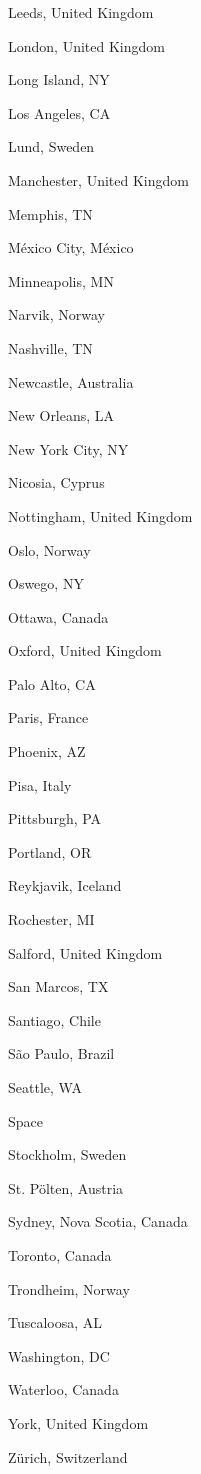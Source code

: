 \documentclass[20pt,landscape]{foils}
\begin{document}
\begin{list1}
\begin{list2}
    \item Leeds, United Kingdom
    \item London, United Kingdom
    \item Long Island, NY
    \item Los Angeles, CA
    \item Lund, Sweden
    \item Manchester, United Kingdom
    \item Memphis, TN
    \item México City, México
    \item Minneapolis, MN
    \item Narvik, Norway
    \item Nashville, TN
    \item Newcastle, Australia
    \item New Orleans, LA
    \item New York City, NY
    \item Nicosia, Cyprus
    \item Nottingham, United Kingdom
    \item Oslo, Norway
    \item Oswego, NY
    \item Ottawa, Canada
    \item Oxford, United Kingdom
    \item Palo Alto, CA
    \item Paris, France
    \item Phoenix, AZ
    \item Pisa, Italy
    \item Pittsburgh, PA
    \item Portland, OR
    \item Reykjavik, Iceland
    \item Rochester, MI
    \item Salford, United Kingdom
    \item San Marcos, TX
    \item Santiago, Chile
    \item São Paulo, Brazil
    \item Seattle, WA
    \item Space
    \item Stockholm, Sweden
    \item St. Pölten, Austria
    \item Sydney, Nova Scotia, Canada
    \item Toronto, Canada
    \item Trondheim, Norway
    \item Tuscaloosa, AL
    \item Washington, DC
    \item Waterloo, Canada
    \item York, United Kingdom
    \item Zürich, Switzerland
  \end{list2}
\end{list1}
\end{document}

